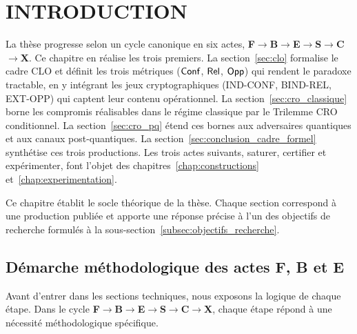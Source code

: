 
\section{INTRODUCTION}
\label{sec:introduction_cadre_formel}

\begin{sloppypar}
La th\`ese progresse selon un cycle canonique en six actes,
\textbf{F}$\to$\textbf{B}$\to$\textbf{E}$\to$\textbf{S}$\to$\textbf{C}$\to$\textbf{X}.
Ce chapitre en r\'ealise les trois premiers. La section~\ref{sec:clo}
formalise le cadre CLO et d\'efinit les trois m\'etriques
($\mathsf{Conf}$, $\mathsf{Rel}$, $\mathsf{Opp}$) qui rendent le paradoxe tractable, en y
int\'egrant les jeux cryptographiques (IND-CONF, BIND-REL, EXT-OPP) qui
captent leur contenu op\'erationnel. La section~\ref{sec:cro_classique}
borne les compromis r\'ealisables dans le r\'egime classique par
le Trilemme CRO conditionnel. La section~\ref{sec:cro_pq} \'etend
ces bornes aux adversaires quantiques et aux canaux post-quantiques. La
section~\ref{sec:conclusion_cadre_formel} synth\'etise ces trois
productions. Les trois actes suivants, saturer, certifier et
exp\'erimenter, font l'objet des chapitres~\ref{chap:constructions}
et~\ref{chap:experimentation}.

Ce chapitre \'etablit le socle th\'eorique de la th\`ese. Chaque section
correspond \`a une production publi\'ee et apporte une r\'eponse pr\'ecise
\`a l'un des objectifs de recherche formul\'es \`a la
sous-section~\ref{subsec:objectifs_recherche}.

\subsection{D\'emarche m\'ethodologique des actes
\textbf{F}, \textbf{B} et \textbf{E}}
\label{subsec:demarche_methodologique}

Avant d'entrer dans les sections techniques, nous exposons la logique de
chaque \'etape. Dans le cycle
\textbf{F}$\to$\textbf{B}$\to$\textbf{E}$\to$\textbf{S}$\to$\textbf{C}$\to$\textbf{X},
chaque \'etape r\'epond \`a une n\'ecessit\'e m\'ethodologique sp\'ecifique.


\end{sloppypar}
